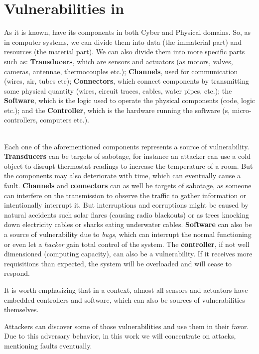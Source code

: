 \documentclass[../main.tex]{subfiles}
\begin{document}
\section{Vulnerabilities in \cps{}}

As it is known, \cps{} have its components in both Cyber and Physical domains.
So, as in computer systems, we can divide them into data (the immaterial part) and resources (the material part). We can also divide them into more specific parts such as: \textbf{Transducers}, which are sensors and actuators (as motors, valves, cameras, antennae, thermocouples etc.);
\textbf{Channels}, used for communication (wires, air, tubes etc); \textbf{Connectors}, which connect components by transmitting some physical quantity (wires, circuit traces, cables, water pipes, etc.);
the \textbf{Software}, which is the logic used to operate the physical components (code, \plc{} logic etc.); and the \textbf{Controller}, which is the hardware running the software (\plc{}s, micro-controllers, computers etc.).

~\\Each one of the aforementioned components represents a source of vulnerability.
\\\textbf{Transducers} can be targets of sabotage, for instance an attacker can use a cold object to disrupt thermostat readings to increase the temperature of a room. But the components may also deteriorate with time, which can eventually cause a fault.
\textbf{Channels} and \textbf{connectors} can as well be targets of sabotage, as someone can interfere on the transmission to observe the traffic to gather information or intentionally interrupt it. But interruptions and corruptions might be caused by natural accidents such solar flares (causing radio blackouts) or as trees knocking down electricity cables or sharks eating underwater cables.
\textbf{Software} can also be a source of vulnerability due to \emph{bugs}, which can interrupt the normal functioning or even let a \emph{hacker} gain total control of the system.
The \textbf{controller}, if not well dimensioned (computing capacity), can also be a vulnerability.
If it receives more requisitions than expected, the system will be overloaded and will cease to respond.

It is worth emphasizing that in a \iot{} context, almost all sensors and actuators have embedded controllers and software, which can also be sources of vulnerabilities themselves.

Attackers can discover some of those vulnerabilities and use them in their favor. Due to this adversary behavior, in this work we will concentrate on attacks, mentioning faults eventually.
\end{document}
